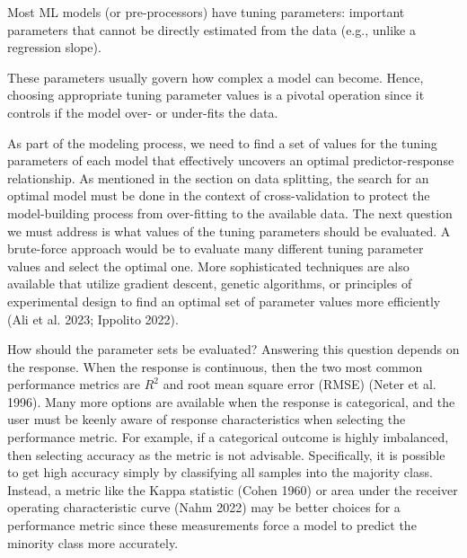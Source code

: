 \documentclass[
  letterpaper,
  DIV=11,
  numbers=noendperiod]{scrartcl}
\begin{document}
\begin{tcolorbox}[enhanced jigsaw, title=\textcolor{quarto-callout-important-color}{\faExclamation}\hspace{0.5em}{\textbf{WTF} \#9}, rightrule=.15mm, leftrule=.75mm, bottomtitle=1mm, opacityback=0, opacitybacktitle=0.6, bottomrule=.15mm, arc=.35mm, colframe=quarto-callout-important-color-frame, breakable, toprule=.15mm, toptitle=1mm, colback=white, titlerule=0mm, coltitle=black, left=2mm, colbacktitle=quarto-callout-important-color!10!white]

Most ML models (or pre-processors) have tuning parameters: important
parameters that cannot be directly estimated from the data (e.g., unlike
a regression slope).

These parameters usually govern how complex a model can become. Hence,
choosing appropriate tuning parameter values is a pivotal operation
since it controls if the model over- or under-fits the data.

\end{tcolorbox}

As part of the modeling process, we need to find a set of values for the
tuning parameters of each model that effectively uncovers an optimal
predictor-response relationship. As mentioned in the section on data
splitting, the search for an optimal model must be done in the context
of cross-validation to protect the model-building process from
over-fitting to the available data. The next question we must address is
what values of the tuning parameters should be evaluated. A brute-force
approach would be to evaluate many different tuning parameter values and
select the optimal one. More sophisticated techniques are also available
that utilize gradient descent, genetic algorithms, or principles of
experimental design to find an optimal set of parameter values more
efficiently (Ali et al. 2023; Ippolito 2022).

How should the parameter sets be evaluated? Answering this question
depends on the response. When the response is continuous, then the two
most common performance metrics are \(R^2\) and root mean square error
(RMSE) (Neter et al. 1996). Many more options are available when the
response is categorical, and the user must be keenly aware of response
characteristics when selecting the performance metric. For example, if a
categorical outcome is highly imbalanced, then selecting accuracy as the
metric is not advisable. Specifically, it is possible to get high
accuracy simply by classifying all samples into the majority class.
Instead, a metric like the Kappa statistic (Cohen 1960) or area under
the receiver operating characteristic curve (Nahm 2022) may be better
choices for a performance metric since these measurements force a model
to predict the minority class more accurately.
\end{document}
